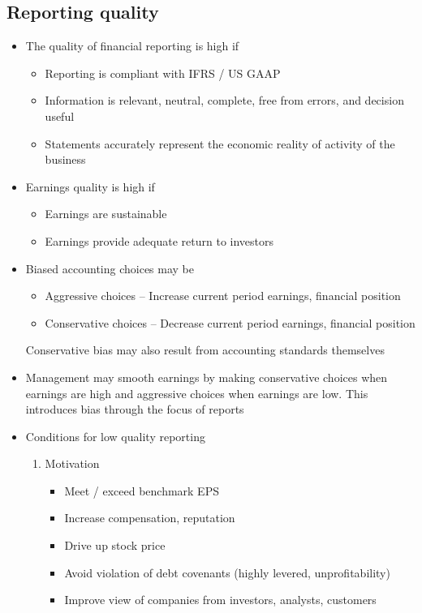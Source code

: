 \documentclass[../notes_compiled.tex]{subfiles}
\begin{document}
\subsection{Reporting quality}
\begin{itemize}

\item The quality of financial reporting is high if
\begin{itemize}
\item Reporting is compliant with IFRS / US GAAP
\item Information is relevant, neutral, complete, free from errors, and decision useful
\item Statements accurately represent the economic reality of activity of the business
\end{itemize}

\item Earnings quality is high if
\begin{itemize}
\item Earnings are sustainable
\item Earnings provide adequate return to investors
\end{itemize}

\item Biased accounting choices may be
\begin{itemize}
\item Aggressive choices -- Increase current period earnings, financial position
\item Conservative choices -- Decrease current period earnings, financial position
\end{itemize}
Conservative bias may also result from accounting standards themselves

\item Management may smooth earnings by making conservative choices when earnings are high and aggressive choices when earnings are low. This introduces bias through the focus of reports

\item Conditions for low quality reporting
\begin{enumerate}
\item Motivation
\begin{itemize}
\item Meet / exceed benchmark EPS
\item Increase compensation, reputation
\item Drive up stock price
\item Avoid violation of debt covenants (highly levered, unprofitability)
\item Improve view of companies from investors, analysts, customers
\end{itemize}



\end{enumerate}
\end{itemize}
\end{document}
